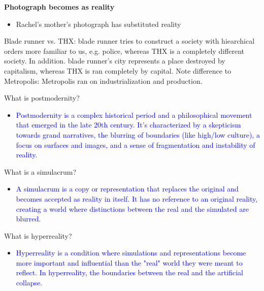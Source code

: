 \documentclass[11pt,fleqn]{book} %
\begin{document}
\textbf{Photograph becomes as reality}
\begin{itemize}
    \item Rachel's mother's photograph has substituted reality
\end{itemize}

\begin{remark}
    Blade runner vs. THX: blade runner tries to construct a society with hiearchical orders more familiar to us, e.g. police, whereas THX is a completely different society. In addition. blade runner's city represents a place destroyed by capitalism, whereas THX is ran completely by capital. Note difference to Metropolis: Metropolis ran on industrialization and production.
\end{remark}

\begin{exercise}
What is postmodernity?
\begin{itemize}
\item \textcolor{blue}{Postmodernity is a complex historical period and a philosophical movement that emerged in the late 20th century. It's characterized by a skepticism towards grand narratives, the blurring of  boundaries (like high/low culture), a focus on surfaces and images, and a sense of fragmentation and instability of reality. }
\end{itemize}
\end{exercise}

\begin{exercise}
What is a simulacrum?
\begin{itemize}
\item \textcolor{blue}{A simulacrum is a copy or representation that replaces the original and becomes accepted as reality in itself. It has no reference to an original reality, creating a world where distinctions between the real and the simulated are blurred.}
\end{itemize}
\end{exercise}

\begin{exercise}
What is hyperreality?
\begin{itemize}
\item \textcolor{blue}{Hyperreality is a condition where simulations and representations become more important and influential than the "real" world they were meant to reflect. In hyperreality, the boundaries between the real and the artificial collapse.}
\end{itemize}
\end{exercise}
\end{document}
